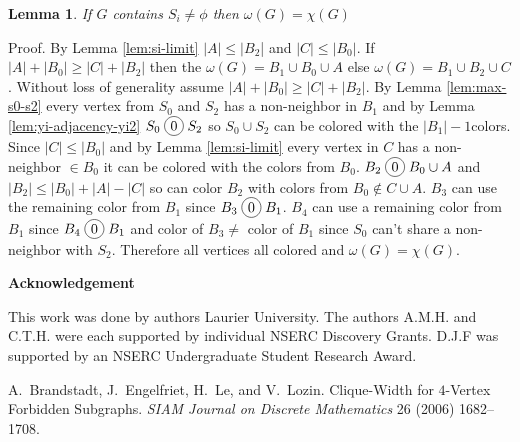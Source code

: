 \documentclass[12pt]{article}
\newcommand*\circled[1]{\tikz[baseline=(char.base)]{
            \node[shape=circle,draw,inner sep=2pt] (char) {#1};}}
\newtheorem{Lemma}[Theorem]{Lemma}
\begin{document}
\begin{Lemma}\label{lem:omega-equals-chromatic}
If $G$ contains $S_i \neq \phi$ then $\omega(G) = \chi(G)$
\end{Lemma}
\noindent {\it} Proof. By Lemma \ref{lem:si-limit} $|A| \leq |B_2$| and $|C| \leq |B_0|$. If $|A| + |B_0| \geq |C| + |B_2|$ then the $\omega(G) = B_1 \cup B_0 \cup A$ else $\omega(G) = B_1 \cup B_2 \cup C$. Without loss of generality assume $|A| +|B_0| \geq |C| + |B_2|$. By Lemma \ref{lem:max-s0-s2} every vertex from $S_0$ and $S_2$ has a non-neighbor in $B_1$ and by Lemma \ref{lem:yi-adjacency-yi2} $S_0 \;\circled{0}\; S_2$ so $S_0 \cup S_2$ can be colored with the $|B_1| - 1$colors. Since $|C| \leq |B_0|$ and by Lemma \ref{lem:si-limit} every vertex in $C$ has a non-neighbor $\in B_0$ it can be colored with the colors from $B_0$. $B_2 \;\circled{0}\;B_0 \cup A$ and $|B_2| \leq |B_0| +|
A| - |C|$ so can color $B_2$ with colors from $B_0 \not \in C \cup A$. $B_3$ can use the remaining color from $B_1$ since $B_3 \;\circled{0}\; B_1$. $B_4$ can use a remaining color from $B_1$ since $B_4 \;\circled{0}\; B_1$ and color of $B_3 \neq$ color of $B_1$ since $S_0$ can't share a non-neighbor with $S_2$. Therefore all vertices all colored and $\omega(G) = \chi(G)$.

\begin{center}
{\bf Acknowledgement}
\end{center}
This work was done by authors  Laurier University. The authors A.M.H. and C.T.H. were each supported by individual NSERC Discovery Grants. D.J.F was supported by an NSERC Undergraduate Student Research Award.


\clearpage
\begin{thebibliography}{99}


    A.~Brandstadt, J.~Engelfriet, H.~Le, and V.~Lozin. Clique-Width for $4$-Vertex Forbidden Subgraphs.  {\sl SIAM
     Journal on Discrete Mathematics} 26 (2006) 1682--1708.

\end{thebibliography}
\end{document}
